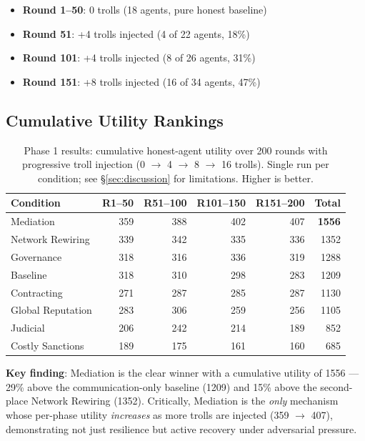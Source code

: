 \documentclass{article}
\begin{document}
\begin{itemize}
  \item \textbf{Round 1--50}: 0 trolls (18 agents, pure honest baseline)
  \item \textbf{Round 51}: +4 trolls injected (4 of 22 agents, 18\%)
  \item \textbf{Round 101}: +4 trolls injected (8 of 26 agents, 31\%)
  \item \textbf{Round 151}: +8 trolls injected (16 of 34 agents, 47\%)
\end{itemize}

\subsection{Cumulative Utility Rankings}

\begin{table}[H]
\centering
\begin{tabular}{@{}lrrrrr@{}}
\toprule
Condition & R1--50 & R51--100 & R101--150 & R151--200 & \textbf{Total} \\
\midrule
Mediation                         & 359 & 388 & 402 & 407 & \textbf{1556} \\
Network Rewiring     & 339 & 342 & 335 & 336 & 1352 \\
Governance                        & 318 & 316 & 336 & 319 & 1288 \\
Baseline                          & 318 & 310 & 298 & 283 & 1209 \\
Contracting                       & 271 & 287 & 285 & 287 & 1130 \\
Global Reputation                 & 283 & 306 & 259 & 256 & 1105 \\
Judicial                          & 206 & 242 & 214 & 189 &  852 \\
Costly Sanctions                  & 189 & 175 & 161 & 160 &  685 \\
\bottomrule
\end{tabular}
\caption{Phase 1 results: cumulative honest-agent utility over 200 rounds with progressive troll injection (0 $\to$ 4 $\to$ 8 $\to$ 16 trolls). Single run per condition; see \S\ref{sec:discussion} for limitations. Higher is better.}
\label{tab:phase1_results}
\end{table}

\textbf{Key finding}: Mediation is the clear winner with a cumulative utility of 1556 --- 29\% above the communication-only baseline (1209) and 15\% above the second-place Network Rewiring (1352). Critically, Mediation is the \textit{only} mechanism whose per-phase utility \textit{increases} as more trolls are injected (359 $\to$ 407), demonstrating not just resilience but active recovery under adversarial pressure.
\end{document}

